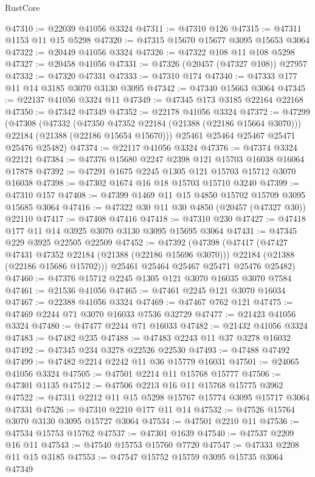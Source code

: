 \begin{lexlean}{RustCore}
\begin{coremodule}
@47310 := @22039 @41056 @3324
@47311 := @47310 @126
@47315 := @47311 @1153 @11 @15 @5298
@47320 := @47315 @15670 @15677 @3095 @15653 @3064
@47322 := @20449 @41056 @3324
@47326 := @47322 @108 @11 @108 @5298
@47327 := @20458 @41056
@47331 := @47326 (@20457 (@47327 @108)) @27957
@47332 := @47320 @47331
@47333 := @47310 @174
@47340 := @47333 @177 @11 @14 @3185 @3070 @3130 @3095
@47342 := @47340 @15663 @3064
@47345 := @22137 @41056 @3324 @11
@47349 := @47345 @173 @3185 @22164 @22168
@47350 := @47342 @47349
@47352 := @22178 @41056 @3324
@47372 := @47299
    (@47308
      (@47332
        (@47350 @47352 @22184 (@21388 (@22186 @15664 @3070)))
        @22184
        (@21388 (@22186 @15654 @15670)))
      @25461
      @25464
      @25467
      @25471
      @25476
      @25482)
@47374 := @22117 @41056 @3324
@47376 := @47374 @3324 @22121
@47384 := @47376 @15680 @2247 @2398 @121 @15703 @16038 @16064 @17878
@47392 := @47291 @1675 @2245 @1305 @121 @15703 @15712 @3070 @16038
@47398 := @47302 @1674 @16 @18 @15703 @15710 @3240
@47399 := @47310 @157
@47408 := @47399 @1469 @11 @15 @4850 @15702 @15709 @3095 @15685 @3064
@47416 := @47322 @30 @11 @30 @4850 (@20457 (@47327 @30)) @22110
@47417 := @47408 @47416
@47418 := @47310 @230
@47427 := @47418 @177 @11 @14 @3925 @3070 @3130 @3095 @15695 @3064
@47431 := @47345 @229 @3925 @22505 @22509
@47452 := @47392
    (@47398
      (@47417
        (@47427 @47431 @47352 @22184 (@21388 (@22186 @15696 @3070)))
        @22184
        (@21388 (@22186 @15686 @15702)))
      @25461
      @25464
      @25467
      @25471
      @25476
      @25482)
@47460 := @47376 @15712 @2245 @1305 @121 @3070 @16035 @3070 @7584
@47461 := @21536 @41056
@47465 := @47461 @2245 @121 @3070 @16034
@47467 := @22388 @41056 @3324
@47469 := @47467 @762 @121
@47475 := @47469 @2244 @71 @3070 @16033 @7536 @32729
@47477 := @21423 @41056 @3324
@47480 := @47477 @2244 @71 @16033
@47482 := @21432 @41056 @3324
@47483 := @47482 @235
@47488 := @47483 @2243 @11 @37 @3278 @16032
@47492 := @47345 @234 @3278 @22526 @22530
@47493 := @47488 @47492
@47499 := @47482 @2214 @2242 @11 @36 @15779 @16031
@47501 := @24065 @41056 @3324
@47505 := @47501 @2214 @11 @15768 @15777
@47506 := @47301 @1135
@47512 := @47506 @2213 @16 @11 @15768 @15775 @3962
@47522 := @47311 @2212 @11 @15 @5298 @15767 @15774 @3095 @15717 @3064 @47331
@47526 := @47310 @2210 @177 @11 @14
@47532 := @47526 @15764 @3070 @3130 @3095 @15727 @3064
@47534 := @47501 @2210 @11
@47536 := @47534 @15753 @15762
@47537 := @47301 @1639
@47540 := @47537 @2209 @16 @11
@47543 := @47540 @15753 @15760 @7720
@47547 := @47333 @2208 @11 @15 @3185
@47553 := @47547 @15752 @15759 @3095 @15735 @3064 @47349

\end{coremodule}
\end{lexlean}
